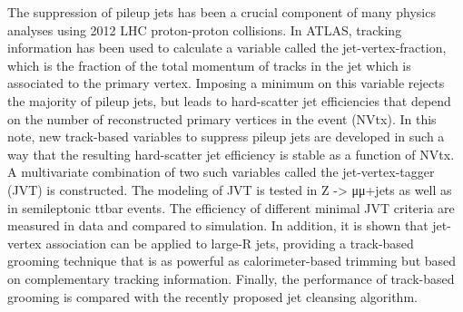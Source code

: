 The suppression of pileup jets has been a crucial component of many physics analyses
using 2012 LHC proton-proton collisions. In ATLAS, tracking information has been used to
calculate a variable called the jet-vertex-fraction, which is the fraction of the total momentum 
of tracks in the jet which is associated to the primary vertex. Imposing a minimum on
this variable rejects the majority of pileup jets, but leads to hard-scatter jet efficiencies that
depend on the number of reconstructed primary vertices in the event (NVtx). In this note,
new track-based variables to suppress pileup jets are developed in such a way that the resulting 
hard-scatter jet efficiency is stable as a function of NVtx. A multivariate combination of
two such variables called the jet-vertex-tagger (JVT) is constructed. The modeling of JVT
is tested in Z -> μμ+jets as well as in semileptonic ttbar events. The efficiency of different minimal 
JVT criteria are measured in data and compared to simulation. In addition, it is shown
that jet-vertex association can be applied to large-R jets, providing a track-based grooming
technique that is as powerful as calorimeter-based trimming but based on complementary
tracking information. Finally, the performance of track-based grooming is compared with
the recently proposed jet cleansing algorithm.
